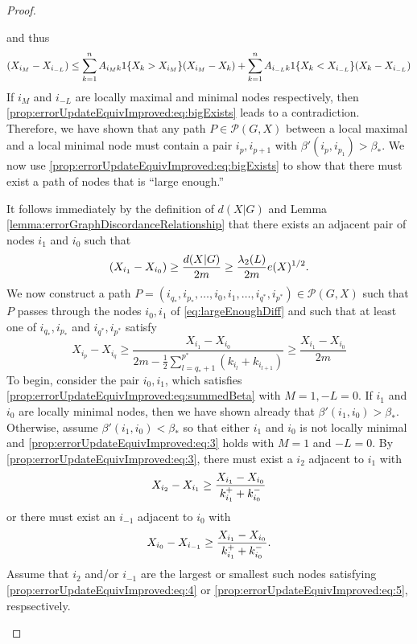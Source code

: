 \documentclass{article}
\theoremstyle{remark}
\begin{document}
\begin{proof}
\begin{enumerate}
			and thus
			\begin{equation}{\label{prop:errorUpdateEquivImproved:eq:bigExists}}
			(X_{i_M}-X_{i_{-L}}) \leq \sum_{k=1}^nA_{i_Mk}1\{X_{k}>X_{i_M}\}(X_{i_M}-X_k) + \sum_{k=1}^nA_{i_{-L}k}1\{X_{k}<X_{i_{-L}}\}(X_k-X_{i_{-L}})
			\end{equation}
			If $i_M$ and $i_{-L}$ are locally maximal and minimal nodes respectively, then \eqref{prop:errorUpdateEquivImproved:eq:bigExists} leads to a contradiction. Therefore, we have shown that any path $P\in\mathcal{P}(G,X)$ between a local maximal and a local minimal node must contain a pair $i_p,i_{p+1}$ with $\beta'(i_p,i_{p_1})>\beta_*$. We now use \eqref{prop:errorUpdateEquivImproved:eq:bigExists} to show that there must exist a path of nodes that is ``large enough.''

			It follows immediately by the definition of $d(X|G)$ and Lemma \ref{lemma:errorGraphDiscordanceRelationship} that there exists an adjacent pair of nodes $i_1$ and $i_0$ such that
			\begin{equation}{\label{eq:largeEnoughDiff}}
				(X_{i_1}-X_{i_0}) \geq \frac{d(X|G)}{2m}\geq\frac{\lambda_2(L)}{2m}e(X)^{1/2}.
			\end{equation}
			We now construct a path $P=(i_{q_*},i_{p_*},\ldots,i_0,i_1,\ldots,i_{q^*},i_{p^*})\in\mathcal{P}(G,X)$ such that $P$ passes through the nodes $i_0,i_1$ of \eqref{eq:largeEnoughDiff} and such that at least one of $i_{q_*},i_{p_*}$ and $i_{q^*},i_{p^*}$ satisfy
			\begin{equation}
				X_{i_p}-X_{i_q}\geq\frac{X_{i_1}-X_{i_0}}{2m-\frac{1}{2}\sum_{l=q_*+1}^{p^*}(k_{i_l}+k_{i_{l+1}})}\geq \frac{X_{i_1}-X_{i_0}}{2m}
			\end{equation}
			To begin, consider the pair $i_0,i_1$, which satisfies \eqref{prop:errorUpdateEquivImproved:eq:summedBeta} with $M=1,-L=0$. If $i_1$ and $i_0$ are locally minimal nodes, then we have shown already that $\beta'(i_1,i_0)>\beta_*$. Otherwise, assume $\beta'(i_1,i_0)<\beta_*$ so that either $i_1$ and $i_0$ is not locally minimal and \eqref{prop:errorUpdateEquivImproved:eq:3} holds with $M=1$ and $-L=0$. By \eqref{prop:errorUpdateEquivImproved:eq:3}, there must exist a $i_2$ adjacent to $i_1$ with
			\begin{equation}{\label{prop:errorUpdateEquivImproved:eq:4}}
				X_{i_2}-X_{i_1}\geq\frac{X_{i_1}-X_{i_0}}{k^+_{i_1}+k^-_{i_0}}
			\end{equation}
			or there must exist an $i_{-1}$ adjacent to $i_{0}$ with
			\begin{equation}{\label{prop:errorUpdateEquivImproved:eq:5}}
				X_{i_0}-X_{i_{-1}}\geq\frac{X_{i_1}-X_{i_0}}{k^+_{i_1}+k^-_{i_0}}.
			\end{equation}
			Assume that $i_2$ and/or $i_{-1}$ are the largest or smallest such nodes satisfying \eqref{prop:errorUpdateEquivImproved:eq:4} or \eqref{prop:errorUpdateEquivImproved:eq:5}, respsectively.


\end{enumerate}
\end{proof}
\end{document}
